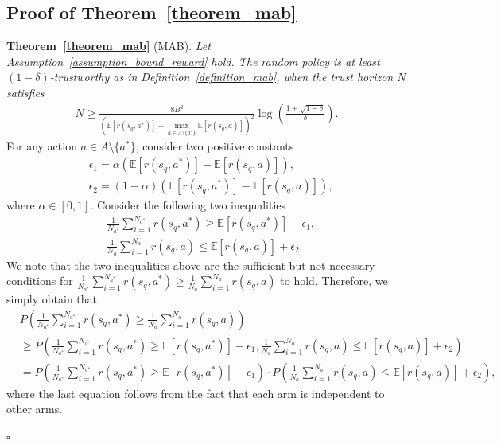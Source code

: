 \documentclass[10pt]{article}
\newenvironment{myproof}{{\noindent\it Proof. }}{\hfill $\square$ \par}
\def\mbE{{\ensuremath{\mathbb E}}}
\begin{document}
\subsection{Proof of Theorem~\ref{theorem_mab}}
\label{appendix_omit_proof_theorem_mab}
\textbf{Theorem~\ref{theorem_mab}} (MAB). \textit{
    Let Assumption~\ref{assumption_bound_reward} hold. The random policy is at least $(1-\delta)$-trustworthy as in Definition~\ref{definition_mab}, when the trust horizon $N$ satisfies
    \begin{align}
        N \geq \frac{8B^2}{\left(\mbE[r(s_q, a^*)] - \max\limits_{a \in A \setminus \{a^*\}} \mbE[r(s_q, a)] \right)^2} \log \left( \frac{1+\sqrt{1-\delta}}{\delta} \right).
    \end{align}
}
\begin{myproof}
For any action $a \in A \setminus \{a^*\} $, consider two positive constants
\begin{align}
    &\epsilon_1 = \alpha \left( \mbE[r(s_q, a^*)] - \mbE[r(s_q, a)] \right), \\
    &\epsilon_2 = (1 - \alpha) \left( \mbE[r(s_q, a^*)] - \mbE[r(s_q, a)] \right),
\end{align}
where $\alpha \in [0, 1]$.
Consider the following two inequalities
\begin{align}
    &\frac{1}{N_{a^*}}  \sum_{i=1}^{N_{a^*}} r(s_q, a^*) \geq \mbE[ r(s_q, a^*)] - \epsilon_1,  \\
    &\frac{1}{N_{a}} \sum_{i=1}^{N_{a}}  r(s_q, a) \leq \mbE[ r(s_q, a)] + \epsilon_2.
\end{align}
We note that the two inequalities above are the sufficient but not necessary conditions for $\frac{1}{N_{a^*}} \sum_{i=1}^{N_{a^*}} r(s_q, a^*) \geq \frac{1}{N_{a}} \sum_{i=1}^{N_{a}} r(s_q, a)$ to hold.
Therefore, we simply obtain that
\begin{align}
    &P \left( \frac{1}{N_{a^*}}  \sum_{i=1}^{N_{a^*}} r(s_q, a^*) \geq \frac{1}{N_{a}} \sum_{i=1}^{N_{a}}  r(s_q, a) \right) \nonumber \\
    &\geq P\left( \frac{1}{N_{a^*}}  \sum_{i=1}^{N_{a^*}} r(s_q, a^*) \geq \mbE[ r(s_q, a^*)] - \epsilon_1, \frac{1}{N_{a}} \sum_{i=1}^{N_{a}}  r(s_q, a) \leq \mbE[ r(s_q, a)] + \epsilon_2 \right) \\
    &=P\left( \frac{1}{N_{a^*}}  \sum_{i=1}^{N_{a^*}} r(s_q, a^*) \geq \mbE[ r(s_q, a^*)] - \epsilon_1 \right) \cdot P\left(\frac{1}{N_{a}} \sum_{i=1}^{N_{a}}  r(s_q, a) \leq \mbE[ r(s_q, a)] + \epsilon_2 \right),
\end{align}
where the last equation follows from the fact that each arm is independent to other arms.

\end{myproof}
\end{document}
